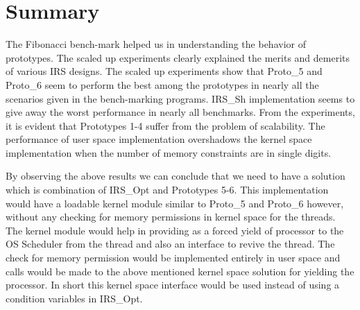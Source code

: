 \section{Summary}

The Fibonacci bench-mark helped us in understanding the behavior of prototypes. 
The scaled up experiments clearly explained the merits and demerits of various IRS designs. 
The scaled up experiments show that Proto\_5 and Proto\_6 seem to perform the best among the prototypes in nearly all the scenarios given in the bench-marking programs. 
IRS\_Sh implementation seems to give away the worst performance in nearly all benchmarks. 
From the experiments, it is evident that Prototypes 1-4 suffer from the problem of scalability. 
The performance of user space implementation overshadows the kernel space implementation when the number of memory constraints are in single digits. 
 
By observing the above results we can conclude that we need to have a solution which is combination of IRS\_Opt and Prototypes 5-6. 
This implementation would have a loadable kernel module similar to Proto\_5 and Proto\_6 however, without any checking for memory permissions in kernel space for the threads. 
The kernel module would help in providing as a forced yield of processor to the OS Scheduler from the thread and also an interface to revive the thread. 
The check for memory permission would be implemented entirely in user space and calls would be made to the above mentioned kernel space solution for yielding the processor.  
In short this kernel space interface would be used instead of using a condition variables in IRS\_Opt.
